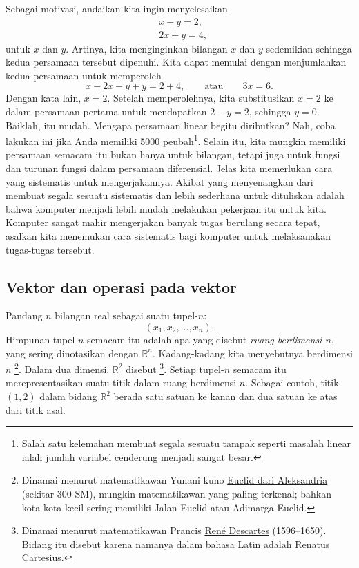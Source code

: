 Sebagai motivasi, andaikan kita ingin menyelesaikan
\begin{equation*}
\begin{aligned}
& x-y = 2 , \\
& 2x+y = 4 ,
\end{aligned}
\end{equation*}
untuk $x$ dan $y$.
Artinya, kita menginginkan bilangan $x$ dan $y$ sedemikian sehingga kedua
persamaan tersebut dipenuhi.
Kita dapat memulai dengan menjumlahkan kedua persamaan untuk memperoleh
\begin{equation*}
x+2x-y+y = 2+4, \qquad \text{atau} \qquad 3x = 6 .
\end{equation*}
Dengan kata lain, $x=2$. Setelah memperolehnya, kita substitusikan $x=2$ ke dalam
persamaan pertama untuk mendapatkan $2-y=2$, sehingga $y=0$. Baiklah\@, itu mudah. Mengapa
persamaan linear begitu diributkan? Nah, coba lakukan ini jika Anda memiliki
5000 peubah\footnote{Salah satu kelemahan membuat segala sesuatu tampak seperti
masalah linear ialah jumlah variabel cenderung menjadi sangat besar.}.
Selain itu, kita mungkin memiliki persamaan semacam itu bukan hanya untuk bilangan,
tetapi juga untuk fungsi dan turunan fungsi dalam persamaan diferensial.
Jelas kita memerlukan cara yang sistematis untuk mengerjakannya.
Akibat yang menyenangkan dari membuat segala sesuatu sistematis dan lebih sederhana untuk dituliskan
adalah bahwa komputer menjadi lebih mudah melakukan pekerjaan itu untuk kita.
Komputer sangat mahir mengerjakan banyak tugas berulang
secara tepat, asalkan kita menemukan cara sistematis bagi komputer untuk
melaksanakan tugas-tugas tersebut.

\subsection{Vektor dan operasi pada vektor}

Pandang $n$ bilangan real sebagai suatu tupel-$n$:
\begin{equation*}
(x_1,x_2,\ldots,x_n).
\end{equation*}
Himpunan tupel-$n$ semacam itu adalah apa yang disebut
\emph{ruang berdimensi $n$},
yang sering dinotasikan dengan ${\mathbb R}^n$.
Kadang-kadang kita menyebutnya
\emph{} berdimensi $n$%
\footnote{Dinamai menurut matematikawan Yunani kuno
\href{https://en.wikipedia.org/wiki/Euclid}{Euclid dari Aleksandria}
(sekitar 300 SM), mungkin matematikawan yang paling terkenal; bahkan
kota-kota kecil sering memiliki Jalan Euclid atau Adimarga Euclid.}.
Dalam dua dimensi, ${\mathbb R}^2$ disebut
\emph{}%
\footnote{Dinamai menurut matematikawan Prancis
\href{https://en.wikipedia.org/wiki/Descartes}{Ren\'e Descartes}
(1596--1650). Bidang itu disebut  karena namanya dalam bahasa Latin adalah Renatus
Cartesius.}.
Setiap tupel-$n$ semacam itu merepresentasikan suatu titik dalam ruang berdimensi $n$.
Sebagai contoh, titik
$(1,2)$ dalam bidang ${\mathbb R}^2$
berada satu satuan ke kanan dan dua satuan ke atas dari
titik asal.

